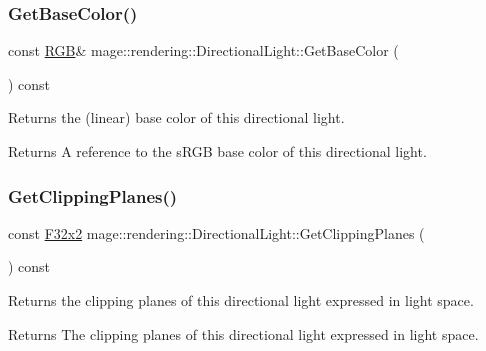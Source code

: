 \subsubsection{\texorpdfstring{Get\+Base\+Color()}{GetBaseColor()}\hspace{0.1cm}{\footnotesize\ttfamily [2/2]}}
{\footnotesize\ttfamily const \mbox{\hyperlink{structmage_1_1_r_g_b}{R\+GB}}\& mage\+::rendering\+::\+Directional\+Light\+::\+Get\+Base\+Color (\begin{DoxyParamCaption}{ }\end{DoxyParamCaption}) const\hspace{0.3cm}{\ttfamily [noexcept]}}

Returns the (linear) base color of this directional light.

\begin{DoxyReturn}{Returns}
A reference to the s\+R\+GB base color of this directional light. 
\end{DoxyReturn}
\mbox{\label{classmage_1_1rendering_1_1_directional_light_a178b7c303793864eaa0d58c81256760d}} 
\subsubsection{\texorpdfstring{Get\+Clipping\+Planes()}{GetClippingPlanes()}}
{\footnotesize\ttfamily const \mbox{\hyperlink{namespacemage_a9dc0d34d6ecc87e4cfa4a826102117bc}{F32x2}} mage\+::rendering\+::\+Directional\+Light\+::\+Get\+Clipping\+Planes (\begin{DoxyParamCaption}{ }\end{DoxyParamCaption}) const\hspace{0.3cm}{\ttfamily [noexcept]}}

Returns the clipping planes of this directional light expressed in light space.

\begin{DoxyReturn}{Returns}
The clipping planes of this directional light expressed in light space. 
\end{DoxyReturn}
\mbox{\label{classmage_1_1rendering_1_1_directional_light_a1cba2b0099366af146c3ccf364946bf8}} 
